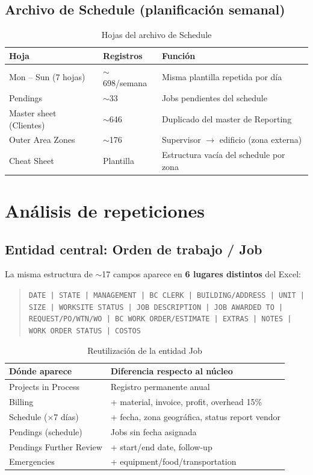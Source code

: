 \documentclass[11pt,a4paper]{article}
\begin{document}
\subsection{Archivo de Schedule (planificaci\'on semanal)}

\begin{table}[h]
\centering
\small
\begin{tabular}{@{}llp{6.5cm}@{}}
\toprule
\textbf{Hoja} & \textbf{Registros} & \textbf{Funci\'on} \\
\midrule
Mon -- Sun (7 hojas) & $\sim$698/semana & Misma plantilla repetida por d\'ia \\
Pendings & $\sim$33 & Jobs pendientes del schedule \\
Master sheet (Clientes) & $\sim$646 & Duplicado del master de Reporting \\
Outer Area Zones & $\sim$176 & Supervisor $\rightarrow$ edificio (zona externa) \\
Cheat Sheet & Plantilla & Estructura vac\'ia del schedule por zona \\
\bottomrule
\end{tabular}
\caption{Hojas del archivo de Schedule}
\end{table}

\section{An\'alisis de repeticiones}

\subsection{Entidad central: Orden de trabajo / Job}

La misma estructura de $\sim$17 campos aparece en \textbf{6 lugares distintos} del Excel:

\begin{quote}
\small
\texttt{DATE | STATE | MANAGEMENT | BC CLERK | BUILDING/ADDRESS | UNIT | SIZE | WORKSITE STATUS | JOB DESCRIPTION | JOB AWARDED TO | REQUEST/PO/WTN/WO | BC WORK ORDER/ESTIMATE | EXTRAS | NOTES | WORK ORDER STATUS | COSTOS}
\end{quote}

\begin{table}[h]
\centering
\small
\begin{tabular}{@{}ll@{}}
\toprule
\textbf{D\'onde aparece} & \textbf{Diferencia respecto al n\'ucleo} \\
\midrule
Projects in Process & Registro permanente anual \\
Billing & + material, invoice, profit, overhead 15\% \\
Schedule ($\times$7 d\'ias) & + fecha, zona geogr\'afica, status report vendor \\
Pendings (schedule) & Jobs sin fecha asignada \\
Pendings Further Review & + start/end date, follow-up \\
Emergencies & + equipment/food/transportation \\
\bottomrule
\end{tabular}
\caption{Reutilizaci\'on de la entidad Job}
\end{table}
\end{document}
